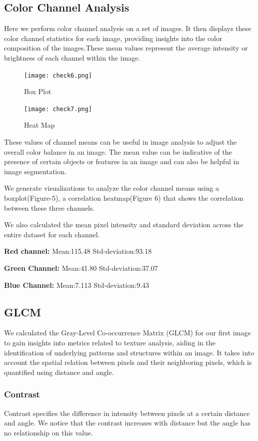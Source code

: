 \documentclass{article}
\begin{document}
\subsection{Color Channel Analysis}
Here we perform color channel analysis on a set of images. It then displays these color channel statistics for each image, providing insights into the color composition of the images.These mean values represent the average intensity or brightness of each channel within the image.
\begin{figure}[h]
  \centering
  \texttt{[image: check6.png]}
  \caption{Box Plot}
  \label{fig:example}
\end{figure}
\begin{figure}[h]
  \centering
  \texttt{[image: check7.png]}
  \caption{Heat Map}
  \label{fig:example}
\end{figure}

These values of channel means can be useful in image analysis to adjust the overall color balance in an image. The mean value can be indicative of the presence of certain objects or features in an image and can also be helpful in image segmentation.

We generate visualizations to analyze the color channel means using a boxplot(Figure-5), a correlation heatmap(Figure 6) that shows the correlation between these three channels.

We also calculated the mean pixel intensity and standard deviation across the entire dataset for each channel.

\textbf{Red channel:} Mean:115.48 Std-deviation:93.18

\textbf{Green Channel:} Mean:41.80 Std-deviation:37.07

\textbf{Blue Channel:} Mean:7.113 Std-deviation:9.43

\subsection{GLCM}
We calculated the Gray-Level Co-occurrence Matrix (GLCM) for our first image to gain insights into metrics related to texture analysis, aiding in the identification of underlying patterns and structures within an image. It takes into account the spatial relation between pixels and their neighboring pixels, which is quantified using distance and angle.

\subsubsection{Contrast}
Contrast specifies the difference in intensity between pixels at a certain distance and angle. We notice that the contrast increases with distance but the angle has no relationship on this value.
\end{document}
